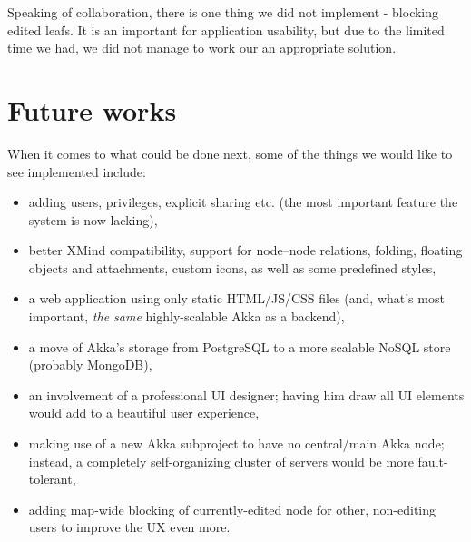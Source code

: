 Speaking of collaboration, there is one thing we did not implement - blocking edited leafs. It is an important for application usability, but due to the limited time we had, we did not manage to work our an appropriate solution. 



\section{Future works}
\label{sec:summary-future}
When it comes to what could be done next, some of the things we would like to see implemented include:

\begin{itemize}
	\item adding users, privileges, explicit sharing etc. (the most important feature the system is now lacking),
	\item better XMind compatibility, support for node--node relations, folding, floating objects and attachments, custom icons, as well as some predefined styles,
	\item a web application using only static HTML/JS/CSS files (and, what's most important, \emph{the same} highly-scalable Akka as a backend),
	\item a move of Akka's storage from PostgreSQL to a more scalable NoSQL store (probably MongoDB),
	\item an involvement of a professional UI designer; having him draw all UI elements would add to a beautiful user experience,
	\item making use of a new  Akka subproject to have no central/main Akka node; instead, a completely self-organizing cluster of servers would be more fault-tolerant,
	\item adding map-wide blocking of currently-edited node for other, non-editing users to improve the UX even more.
\end{itemize}
